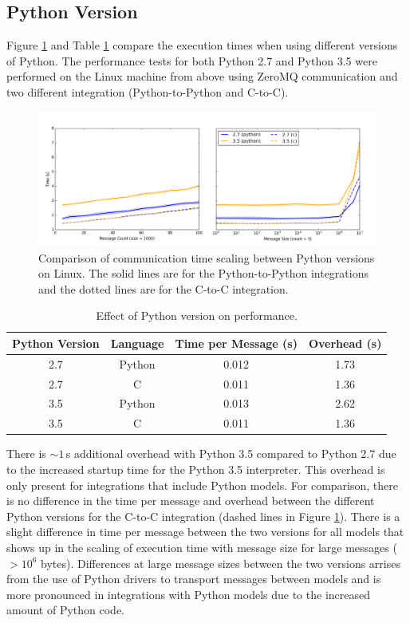 \documentclass[journal]{IEEEtran}
\begin{document}
\subsection{Python Version}\label{SS:results_python}
%
Figure \ref{fig:python} and Table \ref{tab:python} compare the execution times when using different versions of Python. The performance tests for both Python 2.7 and Python 3.5 were performed on the Linux machine from above using ZeroMQ communication and two different integration (Python-to-Python and C-to-C).
%
\ifinclfig
 	\begin{figure}[htbp]
	\begin{center}
	\includegraphics[width=\columnwidth,keepaspectratio]{./images/scaling_python.png}
	\caption{Comparison of communication time scaling between Python versions on Linux. The solid lines are for the Python-to-Python integrations and the dotted lines are for the C-to-C integration.}
	\label{fig:python}
	\end{center}
	\end{figure}
\fi
%
\begin{table}[htbp]
\begin{center}
\begin{tabular}{|c|c|c|c|}
\hline
Python Version	& Language	& Time per Message (s) 	& Overhead (s) 	\\\hline
2.7			& Python		& 0.012				& 1.73			\\
2.7			& C			& 0.011				& 1.36			\\
3.5 			& Python		& 0.013				& 2.62			\\
3.5			& C			& 0.011				& 1.36			\\\hline
\end{tabular}
\end{center}
\caption{Effect of Python version on performance.}
\label{tab:python}
\end{table}          
%
There is $\sim1$\,s additional overhead with Python 3.5 compared to Python 2.7 due to the increased startup time for the Python 3.5 interpreter. This overhead is only present for integrations that include Python models. For comparison, there is no difference in the time per message and overhead between the different Python versions for the C-to-C integration (dashed lines in Figure \ref{fig:python}). There is a slight difference in time per message between the two versions for all models that shows up in the scaling of execution time with message size for large messages ($>10^6$ bytes). Differences at large message sizes between the two versions arrises from the use of Python drivers to transport messages between models and is more pronounced in integrations with Python models due to the increased amount of Python code.
\end{document}
